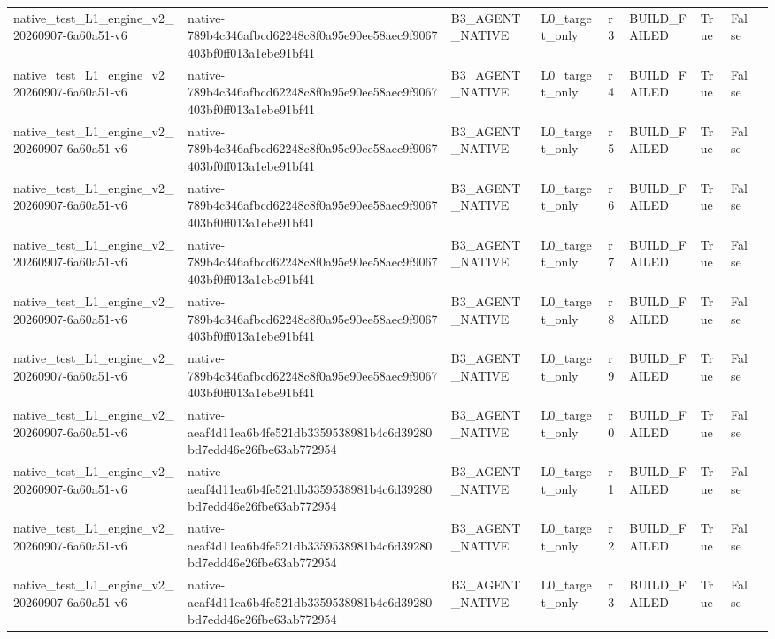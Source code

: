 \begin{tabular}{lllllllll}
native\_test\_L1\_engine\_v2\_20260907-6a60a51-v6 & native-789b4c346afbcd62248c8f0a95e90ee58aec9f9067403bf0ff013a1ebe91bf41 & B3\_AGENT\_NATIVE & L0\_target\_only & r3 & BUILD\_FAILED & True & False &  \\
native\_test\_L1\_engine\_v2\_20260907-6a60a51-v6 & native-789b4c346afbcd62248c8f0a95e90ee58aec9f9067403bf0ff013a1ebe91bf41 & B3\_AGENT\_NATIVE & L0\_target\_only & r4 & BUILD\_FAILED & True & False &  \\
native\_test\_L1\_engine\_v2\_20260907-6a60a51-v6 & native-789b4c346afbcd62248c8f0a95e90ee58aec9f9067403bf0ff013a1ebe91bf41 & B3\_AGENT\_NATIVE & L0\_target\_only & r5 & BUILD\_FAILED & True & False &  \\
native\_test\_L1\_engine\_v2\_20260907-6a60a51-v6 & native-789b4c346afbcd62248c8f0a95e90ee58aec9f9067403bf0ff013a1ebe91bf41 & B3\_AGENT\_NATIVE & L0\_target\_only & r6 & BUILD\_FAILED & True & False &  \\
native\_test\_L1\_engine\_v2\_20260907-6a60a51-v6 & native-789b4c346afbcd62248c8f0a95e90ee58aec9f9067403bf0ff013a1ebe91bf41 & B3\_AGENT\_NATIVE & L0\_target\_only & r7 & BUILD\_FAILED & True & False &  \\
native\_test\_L1\_engine\_v2\_20260907-6a60a51-v6 & native-789b4c346afbcd62248c8f0a95e90ee58aec9f9067403bf0ff013a1ebe91bf41 & B3\_AGENT\_NATIVE & L0\_target\_only & r8 & BUILD\_FAILED & True & False &  \\
native\_test\_L1\_engine\_v2\_20260907-6a60a51-v6 & native-789b4c346afbcd62248c8f0a95e90ee58aec9f9067403bf0ff013a1ebe91bf41 & B3\_AGENT\_NATIVE & L0\_target\_only & r9 & BUILD\_FAILED & True & False &  \\
native\_test\_L1\_engine\_v2\_20260907-6a60a51-v6 & native-aeaf4d11ea6b4fe521db3359538981b4c6d39280bd7edd46e26fbe63ab772954 & B3\_AGENT\_NATIVE & L0\_target\_only & r0 & BUILD\_FAILED & True & False &  \\
native\_test\_L1\_engine\_v2\_20260907-6a60a51-v6 & native-aeaf4d11ea6b4fe521db3359538981b4c6d39280bd7edd46e26fbe63ab772954 & B3\_AGENT\_NATIVE & L0\_target\_only & r1 & BUILD\_FAILED & True & False &  \\
native\_test\_L1\_engine\_v2\_20260907-6a60a51-v6 & native-aeaf4d11ea6b4fe521db3359538981b4c6d39280bd7edd46e26fbe63ab772954 & B3\_AGENT\_NATIVE & L0\_target\_only & r2 & BUILD\_FAILED & True & False &  \\
native\_test\_L1\_engine\_v2\_20260907-6a60a51-v6 & native-aeaf4d11ea6b4fe521db3359538981b4c6d39280bd7edd46e26fbe63ab772954 & B3\_AGENT\_NATIVE & L0\_target\_only & r3 & BUILD\_FAILED & True & False &  \\

\end{tabular}
